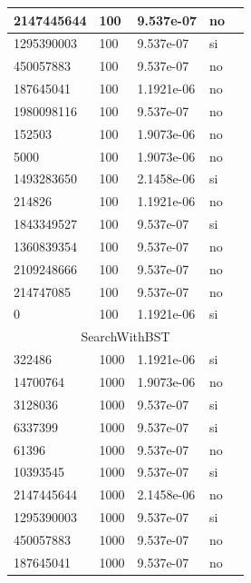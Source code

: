 \documentclass[12pt, fleqn]{article}                             %
\theoremstyle{break}                                            %
\begin{document}
\begin{longtable}{|m{5em}|m{5em}|m{10em}|m{5em}|@{}m{0pt}@{}}
            2147445644& 100  & 9.537e-07 & no &\\[1em]    \hline
            1295390003& 100  & 9.537e-07 & si &\\[1em]    \hline
            450057883& 100  & 9.537e-07 & no &\\[1em]    \hline
            187645041& 100  & 1.1921e-06 & no &\\[1em]    \hline
            1980098116& 100  & 9.537e-07 & no &\\[1em]    \hline
            152503& 100  & 1.9073e-06 & no &\\[1em]    \hline
            5000& 100  & 1.9073e-06 & no &\\[1em]    \hline
            1493283650& 100  & 2.1458e-06 & si &\\[1em]    \hline
            214826& 100  & 1.1921e-06 & no &\\[1em]    \hline
            1843349527& 100  & 9.537e-07 & si &\\[1em]    \hline
            1360839354& 100  & 9.537e-07 & no &\\[1em]    \hline
            2109248666& 100  & 9.537e-07 & no &\\[1em]    \hline
            214747085& 100  & 9.537e-07 & no &\\[1em]    \hline
            0& 100  & 1.1921e-06 & si &\\[1em]    \hline
            \multicolumn{5}{|c|}{SearchWithBST}   \\          \hline
            322486& 1000  & 1.1921e-06 & si &\\[1em]    \hline
            14700764& 1000  & 1.9073e-06 & no &\\[1em]    \hline
            3128036& 1000  & 9.537e-07 & si &\\[1em]    \hline
            6337399& 1000  & 9.537e-07 & si &\\[1em]    \hline
            61396& 1000  & 9.537e-07 & no &\\[1em]    \hline
            10393545& 1000  & 9.537e-07 & si &\\[1em]    \hline
            2147445644& 1000  & 2.1458e-06 & no &\\[1em]    \hline
            1295390003& 1000  & 9.537e-07 & si &\\[1em]    \hline
            450057883& 1000  & 9.537e-07 & no &\\[1em]    \hline
            187645041& 1000  & 9.537e-07 & no &\\[1em]    \hline

\end{longtable}
\end{document}
